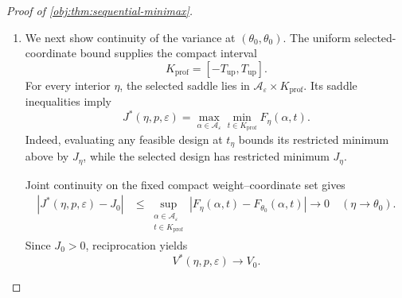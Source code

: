 \begin{proof}[Proof of \cref{obj:thm:sequential-minimax}]
\begin{enumerate}
Given the pilot prefix, the main corrections are independent with mean
\(\tau(\theta')-\tau(\widetilde\theta(\mathbf r))\) and variance
\(\sigma^2(\theta',\widetilde\theta(\mathbf r))\). The estimator formula therefore gives
\[
\mathbb E_{\theta'}^{\mathcal P^*}
\!\left[
\widehat\tau^*-\tau(\theta')
\mid H_{m_n}=\mathbf r
\right]=0.
\]
Expanding the square of the centered sum, the off-diagonal terms vanish by independence and zero means, so
\[
\mathbb E_{\theta'}^{\mathcal P^*}
\!\left[
n(\widehat\tau^*-\tau(\theta'))^2
\mid H_{m_n}=\mathbf r
\right]
=
\frac n{N_n}\,
\sigma^2(\theta',\widetilde\theta(\mathbf r)).
\]
Define the prefix-averaged variance
\[
\overline\sigma_n^2(\theta')
=
\sum_{\mathbf r\in\{0,1,2,3\}^{m_n}}
\omega_{n,\theta'}(\mathbf r)
\sigma^2(\theta',\widetilde\theta(\mathbf r)).
\]
Summing the conditional identity over the finite prefix space gives, for every admissible \(h\),
\[
\mathbb E_{\theta_{n,h}}^{\mathcal P^*}
\!\left[(U_{n,h}^{\mathcal P^*})^2\right]
=
\frac n{N_n}\,
\overline\sigma_n^2(\theta_{n,h}),
\qquad
0\le\overline\sigma_n^2(\theta_{n,h})\le C_\phi^2.
\]

\item
We next show continuity of the variance at \((\theta_0,\theta_0)\). The uniform selected-coordinate bound supplies the compact interval
\[
K_{\mathrm{prof}}=[-T_{\mathrm{up}},T_{\mathrm{up}}].
\]
For every interior \(\eta\), the selected saddle lies in
\(\mathcal A_\varepsilon\times K_{\mathrm{prof}}\). Its saddle inequalities imply
\[
J^*(\eta,p,\varepsilon)
=
\max_{\alpha\in\mathcal A_\varepsilon}
\min_{t\in K_{\mathrm{prof}}}F_\eta(\alpha,t).
\]
Indeed, evaluating any feasible design at \(t_\eta\) bounds its restricted minimum above by \(J_\eta\), while the selected design has restricted minimum \(J_\eta\).

Joint continuity on the fixed compact weight--coordinate set gives
\[
\begin{aligned}
|J^*(\eta,p,\varepsilon)-J_0|
&\le
\sup_{\substack{\alpha\in\mathcal A_\varepsilon\\
t\in K_{\mathrm{prof}}}}
|F_\eta(\alpha,t)-F_{\theta_0}(\alpha,t)|
\longrightarrow0
\quad(\eta\to\theta_0).
\end{aligned}
\]
Since \(J_0>0\), reciprocation yields
\[
V^*(\eta,p,\varepsilon)\longrightarrow V_0.
\]


\end{enumerate}
\end{proof}
